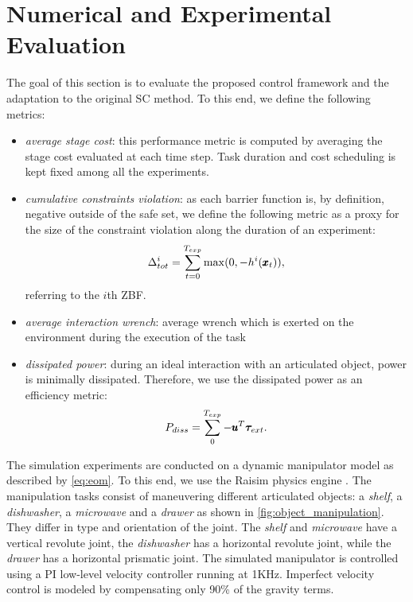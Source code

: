 \section{Numerical and Experimental Evaluation} \label{sec:experiments}

The goal of this section is to evaluate the proposed control framework and the adaptation to the original SC method. To this end, we define the following metrics:
\begin{itemize}
    \item \textit{average stage cost}: this performance metric is computed by averaging the stage cost evaluated at each time step. Task duration and cost scheduling is kept fixed among all the experiments.  
    \item \textit{cumulative constraints violation}: as each barrier function is, by definition, negative outside of the safe set, we define the following metric as a proxy for the size of the constraint violation along the duration of an experiment:
    \begin{equation*}
        \Delta^{i}_{tot} = \sum\limits_{t=0}^{T_{exp}} \max(0, -h^i(\pmb{x}_t)),
    \end{equation*}
    referring to the $i$th ZBF.
    \item \textit{average interaction wrench}: average wrench which is exerted on the environment during the execution of the task
    \item \textit{dissipated power}: during an ideal interaction with an articulated object, power is minimally dissipated. Therefore, we use the dissipated power as an efficiency metric:
    \begin{equation}
        P_{diss} = \sum\limits_{0}^{T_{exp}} -\pmb{u}^T \boldsymbol{\tau}_{ext}.
    \end{equation}
\end{itemize}
The simulation experiments are conducted on a dynamic manipulator model as described by \eqref{eq:eom}. To this end, we use the Raisim physics engine \cite{raisim}. The manipulation tasks consist of maneuvering different articulated objects: a \textit{shelf}, a \textit{dishwasher}, a \textit{microwave} and a \textit{drawer} as shown in \fig\ref{fig:object_manipulation}. They differ in type and orientation of the joint. The \textit{shelf} and \textit{microwave} have a vertical revolute joint, the \textit{dishwasher} has a horizontal revolute joint, while the \textit{drawer} has a horizontal prismatic joint. The simulated manipulator is controlled using a PI low-level velocity controller running at 1KHz. Imperfect velocity control is modeled by compensating only 90\% of the gravity terms.
  
